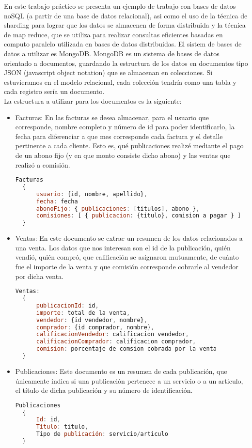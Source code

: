   En este trabajo práctico se presenta un ejemplo de trabajo con bases de datos noSQL (a partir de una base de datos relacional),
asi como el uso de la técnica de sharding para lograr que los datos se almacenen de forma distribuida y la técnica de map reduce,
que se utiliza para realizar consultas eficientes basadas en computo paralelo utilizada en bases de datos distribuidas.
El sistem de bases de datos a utilizar es MongoDB. MongoDB es un sistema de bases de datos orientado a documentos, guardando
la estructura de los datos en documentos tipo JSON (javascript object notation) que se almacenan en colecciones. Si estuvieramos
en el modelo relacional, cada colección tendría como una tabla y cada registro sería un documento.\\
  La estructura a utilizar para los documentos es la siguiente:
\begin{itemize}

\item 
  Facturas: En las facturas se desea almacenar, para el usuario que corresponde, nombre completo y número de id
  para poder identificarlo, la fecha para diferenciar a que mes corresponde cada factura y el detalle pertinente a cada cliente.
  Esto es, qué publicaciones realizé mediante el pago de un abono fijo (y en que monto consiste dicho abono) y las ventas que 
  realizó a comisión.
  \begin{lstlisting}[language=JavaScript]
  Facturas
  {
      usuario: {id, nombre, apellido},
      fecha: fecha
      abonoFijo: { publicaciones: [titulos], abono },
      comisiones: [ { publicacion: {titulo}, comision a pagar } ]
  }
  \end{lstlisting}
\item 
  Ventas: En este documento se extrae un resumen de los datos relacionados a una venta. Los datos que nos interesan son
  el id de la publicación, quién vendió, quién compró, que calificación se asignaron mutuamente, de cuánto fue el importe de la venta
  y que comisión corresponde cobrarle al vendedor por dicha venta.
  \begin{lstlisting}[language=JavaScript]
  Ventas:
  {
      publicacionId: id,
      importe: total de la venta,
      vendedor: {id vendedor, nombre},
      comprador: {id comprador, nombre},
      calificacionVendedor: calificacion vendedor,
      calificacionComprador: calificacion comprador,
      comision: porcentaje de comsion cobrada por la venta
  }
  \end{lstlisting}
\item 
  Publicaciones: Este documento es un resumen de cada publicación, que únicamente indica si una publicación pertenece a un servicio o a un articulo,
  el título de dicha publicación y su número de identificación.
  \begin{lstlisting}[language=JavaScript]
  Publicaciones
  {
      Id: id,
      Tìtulo: titulo,
      Tipo de publicación: servicio/articulo
  }
  \end{lstlisting}

\end{itemize}


